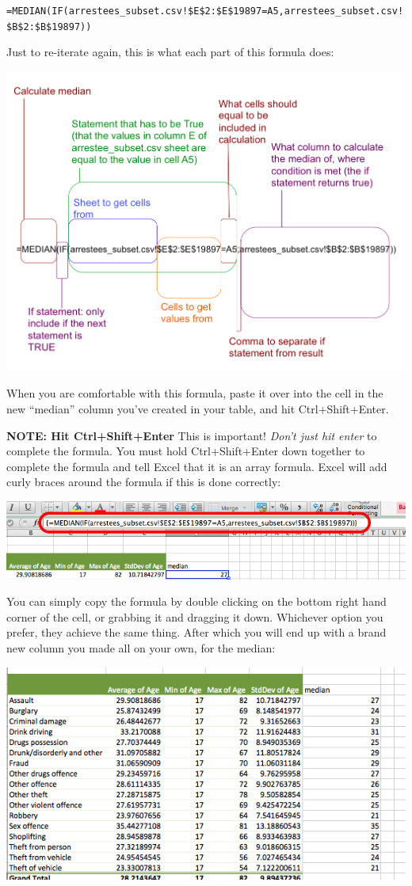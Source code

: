\documentclass[]{book}
\theoremstyle{definition}
\theoremstyle{definition}
\theoremstyle{definition}
\theoremstyle{remark}
\begin{document}
\texttt{=MEDIAN(IF(arrestees\_subset.csv!\$E\$2:\$E\$19897=A5,arrestees\_subset.csv!\$B\$2:\$B\$19897))}

Just to re-iterate again, this is what each part of this formula does:

\includegraphics{imgs/med_excel_equ.png}

When you are comfortable with this formula, paste it over into the cell
in the new ``median'' column you've created in your table, and hit
Ctrl+Shift+Enter.

\textbf{NOTE: Hit Ctrl+Shift+Enter} This is important! \emph{Don't just
hit enter} to complete the formula. You must hold Ctrl+Shift+Enter down
together to complete the formula and tell Excel that it is an array
formula. Excel will add curly braces around the formula if this is done
correctly:

\includegraphics{imgs/curly_brack_formula.png}

You can simply copy the formula by double clicking on the bottom right
hand corner of the cell, or grabbing it and dragging it down. Whichever
option you prefer, they achieve the same thing. After which you will end
up with a brand new column you made all on your own, for the median:

\includegraphics{imgs/final_table_with_median.png}
\end{document}

